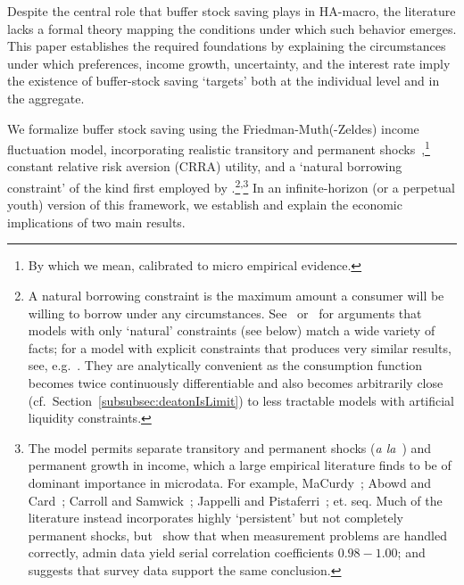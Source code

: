 \documentclass[BufferStockTheory]{subfiles}
\begin{document}
Despite the central role that buffer stock saving plays in HA-macro, the literature lacks a formal theory mapping the conditions under which such behavior emerges.  This paper establishes the required foundations by explaining the circumstances under which preferences, income growth, uncertainty, and the interest rate imply the existence of buffer-stock saving `targets' both at the individual level and in the aggregate.

% 

We formalize buffer stock saving using the Friedman-Muth(-Zeldes) income fluctuation model, incorporating realistic transitory and permanent shocks~\citep{friedmanATheory, muthOptimal, zeldesStochastic},\footnote{By which we mean, calibrated to micro empirical evidence.}  constant relative risk aversion (CRRA) utility, and a `natural borrowing constraint' of the kind first employed by \cite{zeldesStochastic}.\footnote{A natural borrowing constraint is the maximum amount a consumer will be willing to borrow under any circumstances. See~\cite{carrollBSLCPIH} or~\cite{gpLifeCycle} for arguments that models with only `natural' constraints (see below) match a wide variety of facts; for a model with explicit constraints that produces very similar results, see, e.g.~\cite{Cagetti}. They are analytically convenient as the consumption function becomes twice continuously differentiable and also becomes arbitrarily close (cf.\ Section~\ref{subsubsec:deatonIsLimit}) to less tractable models with artificial liquidity constraints.}\textsuperscript{,}\footnote{The model permits separate transitory and permanent shocks (\textit{a la}~\cite{muthOptimal}) and permanent growth in income, which a large empirical literature finds to be of dominant importance in microdata. For example, MaCurdy~\citeyearpar{macurdyTimeseries}; Abowd and Card~\citeyearpar{acCovariance}; Carroll and Samwick~\citeyearpar{csNature}; Jappelli and Pistaferri~\citeyear{jpCins}; et. seq.  Much of the literature instead incorporates highly `persistent' but not completely permanent shocks, but~\cite{dhmImproving} show that when measurement problems are handled correctly, admin data yield serial correlation coefficients $0.98-1.00$; and~\cite{dmHowMuch} suggests that survey data support the same conclusion.}  In an infinite-horizon (or a \cite{blanchardFinite} perpetual youth) version of this framework, we establish and explain the economic implications of two main results.
\end{document}
